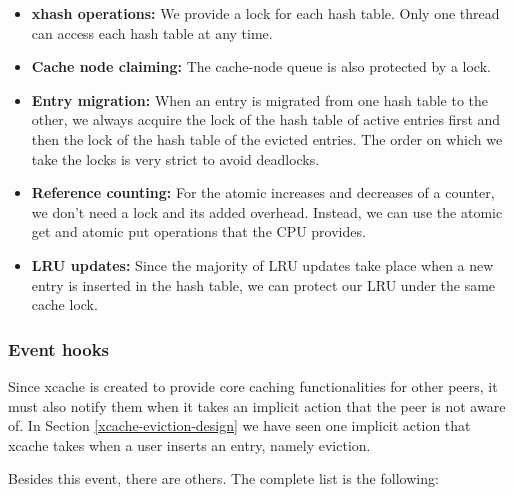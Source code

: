 \begin{itemize}
	\item
		\textbf{xhash operations:} We provide a lock for each hash 
		table. Only one thread can access each hash table at any time.
	\item
		\textbf{Cache node claiming:} The cache-node queue is also 
		protected by a lock.
	\item
		\textbf{Entry migration:} When an entry is migrated from one 
		hash table to the other, we always acquire the lock of the hash 
		table of active entries first and then the lock of the hash 
		table of the evicted entries. The order on which we take the 
		locks is very strict to avoid deadlocks.
	\item
		\textbf{Reference counting:} For the atomic increases and 
		decreases of a counter, we don't need a lock and its added 
		overhead. Instead, we can use the atomic get and atomic put 
		operations that the CPU provides.
	\item
		\textbf{LRU updates:} Since the majority of LRU updates take
		place when a new entry is inserted in the hash table, we can 
		protect our LRU under the same cache lock.
\end{itemize}

\subsubsection{Event hooks}\label{sec:xcache-hooks-design}

Since xcache is created to provide core caching functionalities for other 
peers, it must also notify them when it takes an implicit action that the peer 
is not aware of. In Section \ref{xcache-eviction-design} we have seen one 
implicit action that xcache takes when a user inserts an entry, namely 
eviction. 

Besides this event, there are others. The complete list is the following:

